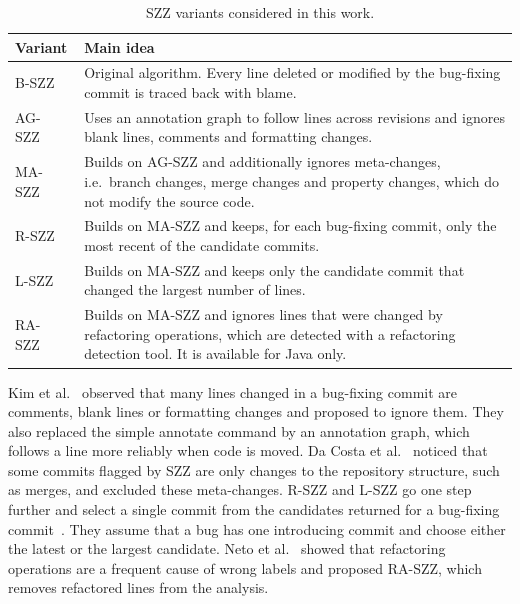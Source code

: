 \documentclass[12pt,a4paper,oneside]{report}
\begin{document}
\begin{table}[htbp]
\centering\small
\caption{SZZ variants considered in this work.}
\label{tab:variants}
\begin{tabularx}{\linewidth}{@{}l>{\raggedright\arraybackslash}X@{}}
\toprule
Variant & Main idea \\
\midrule
B-SZZ~\cite{sliwerski2005szz} & Original algorithm. Every line deleted or
modified by the bug-fixing commit is traced back with blame. \\
AG-SZZ~\cite{kim2006agszz} & Uses an annotation graph to follow lines across
revisions and ignores blank lines, comments and formatting changes. \\
MA-SZZ~\cite{dacosta2017maszz} & Builds on AG-SZZ and additionally ignores
meta-changes, i.e.\ branch changes, merge changes and property changes, which
do not modify the source code. \\
R-SZZ~\cite{davies2014rlszz} & Builds on MA-SZZ and keeps, for each bug-fixing
commit, only the most recent of the candidate commits. \\
L-SZZ~\cite{davies2014rlszz} & Builds on MA-SZZ and keeps only the candidate
commit that changed the largest number of lines. \\
RA-SZZ~\cite{neto2018raszz} & Builds on MA-SZZ and ignores lines that were
changed by refactoring operations, which are detected with a refactoring
detection tool. It is available for Java only. \\
\bottomrule
\end{tabularx}
\end{table}

Kim et al.~\cite{kim2006agszz} observed that many lines changed in a
bug-fixing commit are comments, blank lines or formatting changes and proposed
to ignore them. They also replaced the simple annotate command by an
annotation graph, which follows a line more reliably when code is moved. Da
Costa et al.~\cite{dacosta2017maszz} noticed that some commits flagged by SZZ
are only changes to the repository structure, such as merges, and excluded
these meta-changes. R-SZZ and L-SZZ go one step further and select a single
commit from the candidates returned for a bug-fixing
commit~\cite{davies2014rlszz}. They assume that a bug has one introducing
commit and choose either the latest or the largest candidate. Neto et
al.~\cite{neto2018raszz} showed that refactoring operations are a frequent
cause of wrong labels and proposed RA-SZZ, which removes refactored lines
from the analysis.
\end{document}
